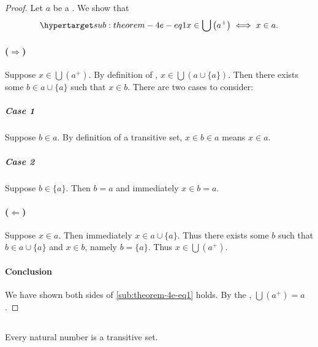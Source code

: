 \documentclass{report}
\begin{document}
\begin{proof}

  Let $a$ be a .
  We show that
    \begin{equation}
      \hyperlabel{sub:theorem-4e-eq1}
      x \in \bigcup \left(a^+\right) \iff x \in a.
    \end{equation}

  \paragraph{($\Rightarrow$)}%

    Suppose $x \in \bigcup \left(a^+\right)$.
    By definition of ,
      $x \in \bigcup \left(a \cup \{a\}\right)$.
    Then there exists some $b \in a \cup \{a\}$ such that $x \in b$.
    There are two cases to consider:

    \subparagraph{Case 1}%

      Suppose $b \in a$.
      By definition of a transitive set, $x \in b \in a$ means $x \in a$.

    \subparagraph{Case 2}%

      Suppose $b \in \{a\}$.
      Then $b = a$ and immediately $x \in b = a$.

  \paragraph{($\Leftarrow$)}%

    Suppose $x \in a$.
    Then immediately $x \in a \cup \{a\}$.
    Thus there exists some $b$ such that $b \in a \cup \{a\}$ and $x \in b$,
      namely $b = \{a\}$.
    Thus $x \in \bigcup \left(a^+\right)$.

  \paragraph{Conclusion}%

    We have shown both sides of \eqref{sub:theorem-4e-eq1} holds.
    By the , $\bigcup \left(a^+\right) = a$.

\end{proof}

\subsection{}%

\begin{theorem}[4F]

  Every natural number is a transitive set.

\end{theorem}
\end{document}
